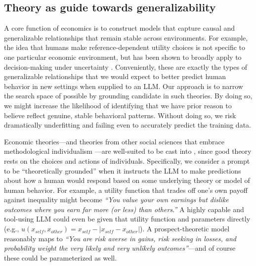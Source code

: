 \subsection{Theory as guide towards generalizability}

A core function of economics is to construct models that capture causal and generalizable relationships that remain stable across environments.
For example, the idea that humans make reference-dependent utility choices is not specific to one particular economic environment, but has been shown to broadly apply to decision-making under uncertainty \citep{prospectkahneman1979}.
Conveniently, these are exactly the types of generalizable relationships that we would expect to better predict human behavior in new settings when supplied to an LLM.
Our approach is to narrow the search space of possible  by grounding candidate  in such theories.
By doing so, we might increase the likelihood of identifying  that we have prior reason to believe reflect genuine, stable behavioral patterns.
Without doing so, we risk dramatically underfitting and failing even to accurately predict the training data.

Economic theories---and theories from other social sciences that embrace methodological individualism \citep{friedman1953methodology}---are well-suited to be cast into , since good theory rests on the choices and actions of individuals.
Specifically, we consider a prompt to be ``theoretically grounded'' when it instructs the LLM to make predictions about how a human would respond based on some underlying theory or model of human behavior.
For example, a utility function that trades off one's own payoff against inequality might become \emph{``You value your own earnings but dislike outcomes where you earn far more (or less) than others.''}
A highly capable and tool-using LLM could even be given that utility function and parameters directly (e.g., $u(x_{self}, x_{other})= x_{self} - | x_{self} - x_{other}|$).
A prospect-theoretic model reasonably maps to \emph{``You are risk averse in gains, risk seeking in losses, and probability weight the very likely and very unlikely outcomes''}---and of course these could be parameterized as well.

